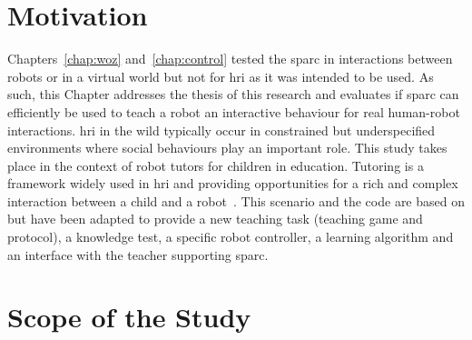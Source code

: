 \section{Motivation}

Chapters~\ref{chap:woz} and~\ref{chap:control} tested the \gls{sparc} in interactions between robots or in a virtual world but not for \gls{hri} as it was intended to be used. As such, this Chapter addresses the thesis of this research and evaluates if \gls{sparc} can efficiently be used to teach a robot an interactive behaviour for real human-robot interactions. \gls{hri} in the wild typically occur in constrained but underspecified environments where social behaviours play an important role.  This study takes place in the context of robot tutors for children in education. Tutoring is a framework widely used in \gls{hri} and providing opportunities for a rich and complex interaction between a child and a robot~\citep{leyzberg2012physical,kennedy2015robot}. This scenario and the code are based on \cite{lemaignan2017free} but have been adapted to provide a new teaching task (teaching game and protocol), a knowledge test, a specific robot controller, a learning algorithm and an interface with the teacher supporting \gls{sparc}.


\section{Scope of the Study} \label{sec:tutoring_scope}

